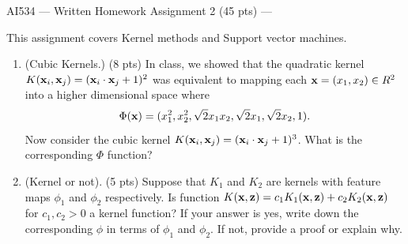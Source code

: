 \documentclass{article}
\def\z{{\bf z}}
\def\x{{\bf x}}
\begin{document}
{\Large
\begin{center}
AI534 --- Written Homework Assignment 2 (45 pts) ---
\end{center}
}
This assignment covers Kernel methods and Support vector machines.
\begin{enumerate}
\item (Cubic Kernels.) (8 pts)  In class, we showed that the quadratic
kernel $K(\x_i,\x_j) = (\x_i \cdot \x_j + 1)^2$ was equivalent to
mapping each $\x=(x_1,x_2)\in R^2 $ into a higher dimensional space where
\[\Phi(\x) = (x_1^2, x_2^2, \sqrt{2}x_1x_2, \sqrt{2}x_1, \sqrt{2}x_2, 1).\]
Now consider the cubic kernel $K(\x_i,\x_j) = (\x_i \cdot \x_j + 1)^3$.  What is the corresponding
$\Phi$ function?


\item (Kernel or not). (5 pts) Suppose that $K_1$ and $K_2$ are kernels with feature maps $\phi_1$ and $\phi_2$ respectively. Is function $K(\x,\z)= c_1K_1(\x, \z)+c_2K_2(\x,\z)$ for $c_1, c_2 >0$ a kernel function?  If your answer is yes, write down the corresponding
$\phi$ in terms of $\phi_1$ and $\phi_2$. If not, provide a proof or explain why.
 

\end{enumerate}
\end{document}
